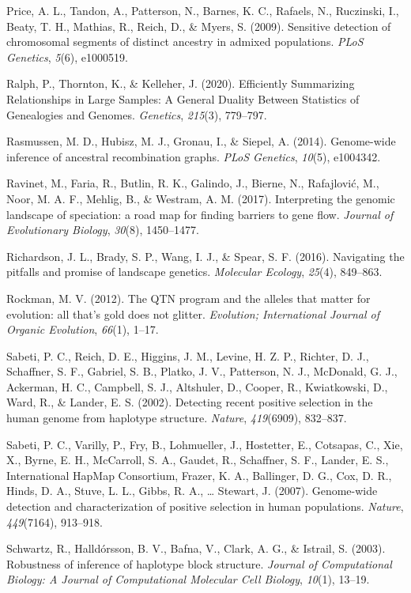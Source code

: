 \documentclass[twocolumn]{bmcart}%
\begin{document}
\begin{backmatter}
\begin{hangparas}{1em}{1}
Price, A. L., Tandon, A., Patterson, N., Barnes, K. C., Rafaels, N.,
Ruczinski, I., Beaty, T. H., Mathias, R., Reich, D., \& Myers, S.
(2009). Sensitive detection of chromosomal segments of distinct ancestry
in admixed populations. \emph{PLoS Genetics}, \emph{5}(6), e1000519.

Ralph, P., Thornton, K., \& Kelleher, J. (2020). Efficiently Summarizing
Relationships in Large Samples: A General Duality Between Statistics of
Genealogies and Genomes. \emph{Genetics}, \emph{215}(3), 779--797.

Rasmussen, M. D., Hubisz, M. J., Gronau, I., \& Siepel, A. (2014).
Genome-wide inference of ancestral recombination graphs. \emph{PLoS
Genetics}, \emph{10}(5), e1004342.

Ravinet, M., Faria, R., Butlin, R. K., Galindo, J., Bierne, N.,
Rafajlović, M., Noor, M. A. F., Mehlig, B., \& Westram, A. M. (2017).
Interpreting the genomic landscape of speciation: a road map for finding
barriers to gene flow. \emph{Journal of Evolutionary Biology},
\emph{30}(8), 1450--1477.

Richardson, J. L., Brady, S. P., Wang, I. J., \& Spear, S. F. (2016).
Navigating the pitfalls and promise of landscape genetics.
\emph{Molecular Ecology}, \emph{25}(4), 849--863.

Rockman, M. V. (2012). The QTN program and the alleles that matter for
evolution: all that's gold does not glitter. \emph{Evolution;
International Journal of Organic Evolution}, \emph{66}(1), 1--17.

Sabeti, P. C., Reich, D. E., Higgins, J. M., Levine, H. Z. P., Richter,
D. J., Schaffner, S. F., Gabriel, S. B., Platko, J. V., Patterson, N.
J., McDonald, G. J., Ackerman, H. C., Campbell, S. J., Altshuler, D.,
Cooper, R., Kwiatkowski, D., Ward, R., \& Lander, E. S. (2002).
Detecting recent positive selection in the human genome from haplotype
structure. \emph{Nature}, \emph{419}(6909), 832--837.

Sabeti, P. C., Varilly, P., Fry, B., Lohmueller, J., Hostetter, E.,
Cotsapas, C., Xie, X., Byrne, E. H., McCarroll, S. A., Gaudet, R.,
Schaffner, S. F., Lander, E. S., International HapMap Consortium,
Frazer, K. A., Ballinger, D. G., Cox, D. R., Hinds, D. A., Stuve, L. L.,
Gibbs, R. A., \ldots{} Stewart, J. (2007). Genome-wide detection and
characterization of positive selection in human populations.
\emph{Nature}, \emph{449}(7164), 913--918.

Schwartz, R., Halldórsson, B. V., Bafna, V., Clark, A. G., \& Istrail,
S. (2003). Robustness of inference of haplotype block structure.
\emph{Journal of Computational Biology: A Journal of Computational
Molecular Cell Biology}, \emph{10}(1), 13--19.


\end{hangparas}
\end{backmatter}
\end{document}
